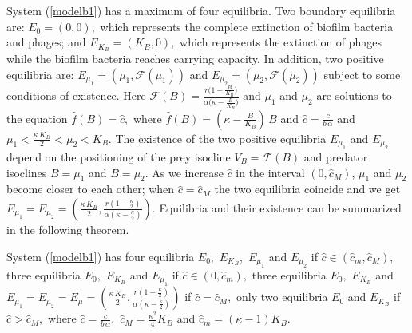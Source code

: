 System (\ref{modelb1}) has a maximum of four equilibria. Two boundary equilibria are: $E_{0}=(0,0),$ which represents the complete extinction of biofilm bacteria and phages; and $E_{K_{B}}=(K_{B},0),$ which represents the extinction of phages while the biofilm bacteria reaches carrying capacity. In addition, two positive equilibria are: $E_{\mu_{1}}=(\mu_{1}, \mathcal{F}(\mu_{1}))$ and $E_{\mu_{2}}=(\mu_{2}, \mathcal{F}(\mu_{2}))$ subject to some conditions of existence. Here 
$\mathcal{F}(B)=\frac{r\big(1-\frac{B}{K_{B}}\big)}{\alpha\big(\kappa-\frac{B}{K_{B}}\big)}$
and $\mu_{1}$ and $\mu_{2}$ are solutions to the equation $\hat{f}(B)=\hat{c},$
where $\hat{f}(B)=\left (\kappa-\frac{B}{K_{B}}\right)\,B$ and $\hat{c}= \frac{c}{b\, \alpha}$
and $\mu_{1}<\frac{\kappa \, K_{B}}{2}<\mu_{2} <K_{B}.$
The existence of the two positive equilibria $E_{\mu_{1}}$ and $E_{\mu_{2}}$ depend on the positioning of the prey isocline $V_{B}=\mathcal{F}(B)$ and predator isoclines $B=\mu_{1}$ and $B=\mu_{2}$. As we increase $\hat{c}$ in the interval $(0, \hat{c}_{M})$, $\mu_{1}$ and $\mu_{2}$ become closer to each other; when $\hat{c}=\hat{c}_{M}$ the two equilibria coincide and we get
$E_{\mu_{1}}=E_{\mu_{2}}=\left(\frac{\kappa \, K_{B}}{2}, \frac{r\left(1-\frac{\kappa}{2}\right)}{\alpha \left(\kappa-\frac{\kappa}{2}\right)}\right).$
Equilibria and their existence can be summarized in the following theorem.
\begin{theorem}
System (\ref{modelb1}) has four equilibria $E_{0},$ $E_{K_{B}},$ $E_{\mu_{1}}$ and $E_{\mu_{2}}$ if $\hat{c} \in (\hat{c}_{m}, \hat{c}_{M}),$ three equilibria $E_{0},$ $E_{K_{B}}$ and $E_{\mu_{1}}$ if $\hat{c} \in (0, \hat{c}_{m}),$ three  equilibria $E_{0},$ $E_{K_{B}}$ and $E_{\mu_{1}}=E_{\mu_{2}}=E_{\mu}=\left(\frac{\kappa \, K_{B}}{2}, \frac{r\left(1-\frac{\kappa}{2}\right)}{\alpha \left(\kappa-\frac{\kappa}{2}\right)}\right)$ if $\hat{c}=\hat{c}_{M},$ only two equilibria $E_{0}$ and $E_{K_{B}}$ if $\hat{c} > \hat{c}_{M},$
where $\hat{c}=\frac{c}{b\, \alpha},$ $\hat{c}_{M}=\frac{\kappa^{2}}{4}K_{B}$ and $\hat{c}_{m}= (\kappa-1)K_{B}.$
\end{theorem}

